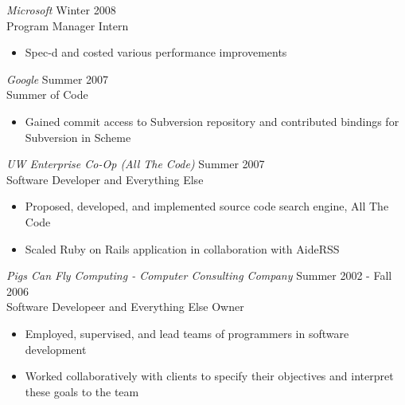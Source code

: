 \documentclass[10pt,line,margin=0.1]{newsres}
\begin{document}
\begin{resume}
        {\sl Microsoft} \hfill        Winter 2008 \\
        Program Manager Intern
        \begin{itemize}
        \item Spec-d and costed various performance improvements
        \end{itemize} 
        {\sl Google} \hfill        Summer 2007 \\
        Summer of Code
        \begin{itemize}
        \item Gained commit access to Subversion repository and contributed bindings for Subversion in Scheme
        \end{itemize} 
        {\sl UW Enterprise Co-Op (All The Code)} \hfill Summer 2007 \\
        Software Developer and Everything Else
        \begin{itemize}  \itemsep -2pt %
        \item{Proposed, developed, and implemented source code search engine, All The Code}
        \item{Scaled Ruby on Rails application in collaboration with AideRSS}
        \end{itemize}
        {\sl Pigs Can Fly Computing - Computer Consulting Company} \hfill Summer 2002 - Fall 2006 \\
        Software Developeer and Everything Else Owner
        \begin{itemize}  \itemsep -2pt %
        \item{Employed, supervised, and lead teams of programmers in software development}
        \item{Worked collaboratively with clients to specify their objectives and interpret these goals to the team}
        \end{itemize}


\end{resume}
\end{document}
